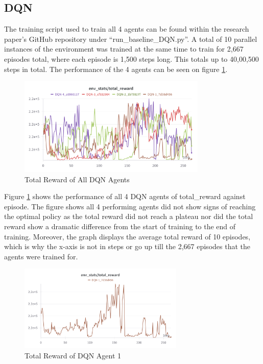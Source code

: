 \subsection{DQN}

The training script used to train all 4 agents can be found within the research paper's GitHub repository under ``run\_baseline\_DQN.py''. A total of 10 parallel instances of the environment was trained at the same time to train for 2,667 episodes total, where each episode is 1,500 steps long. This totals up to 40,00,500 steps in total. The performance of the 4 agents can be seen on figure \ref{fig:agent_eval_all_dqn}. 

\begin{figure}[H]
    \centering
    \includegraphics[width=0.8\textwidth]{figures/DQN_TotalReward.png}
    \caption{Total Reward of All DQN Agents}
    \label{fig:agent_eval_all_dqn}
\end{figure}

Figure \ref{fig:agent_eval_all_dqn} shows the performance of all 4 DQN agents of total\_reward against episode. The figure shows all 4 performing agents did not show signs of reaching the optimal policy as the total reward did not reach a plateau nor did the total reward show a dramatic difference from the start of training to the end of training. Moreover, the graph displays the average total reward of 10 episodes, which is why the x-axis is not in steps or go up till the 2,667 episodes that the agents were trained for.

\begin{figure}[H]
    \centering
    \includegraphics[width=0.7\textwidth]{figures/DQN-1_TotalReward.png}
    \caption{Total Reward of DQN Agent 1}
    \label{fig:agent_eval_dqn_1}
\end{figure}

